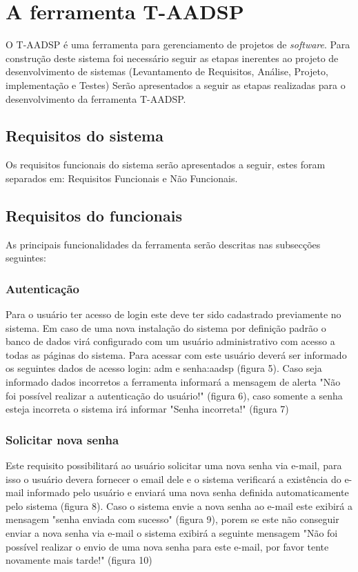 \documentclass{acm_proc_article-sp}
\begin{document}
\section{A ferramenta T-AADSP}
O T-AADSP é uma ferramenta para gerenciamento de projetos de \textit{software}. Para construção deste sistema foi necessário seguir as etapas inerentes ao projeto de desenvolvimento de sistemas (Levantamento de Requisitos, Análise, Projeto, implementação e Testes)
Serão apresentados a seguir as etapas realizadas para o desenvolvimento da ferramenta T-AADSP.

\subsection{Requisitos do sistema}
Os requisitos funcionais do sistema serão apresentados a seguir, estes foram separados em: Requisitos Funcionais e Não Funcionais.

\subsection{Requisitos do funcionais}
As principais funcionalidades da ferramenta serão descritas
nas subsecções seguintes:

\subsubsection{Autenticação}
Para o usuário ter acesso de login este deve ter sido cadastrado previamente no sistema. Em caso de uma nova instalação do sistema por definição padrão o banco de dados virá configurado com um usuário administrativo com  acesso a todas as páginas do sistema. Para acessar com este usuário deverá ser informado os seguintes dados de acesso login: adm e senha:aadsp (figura 5). Caso seja informado dados incorretos a ferramenta informará a mensagem de alerta "Não foi possível realizar a autenticação do usuário!" (figura 6), caso somente a senha esteja incorreta o sistema irá informar "Senha incorreta!" (figura 7)

\subsubsection{Solicitar nova senha}
Este requisito possibilitará ao usuário solicitar uma nova senha via e-mail, para isso o usuário devera fornecer o email dele e o sistema verificará a existência do e-mail informado pelo usuário e enviará uma nova senha definida automaticamente pelo sistema (figura 8). Caso o sistema envie a nova senha ao e-mail este exibirá a mensagem "senha enviada com sucesso" (figura 9), porem se este não conseguir enviar a nova senha via e-mail o sistema exibirá a seguinte mensagem "Não foi possível realizar o envio de uma nova senha para este e-mail, por favor tente novamente mais tarde!" (figura 10)
\end{document}
